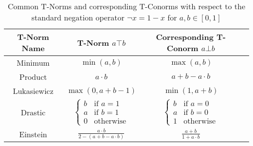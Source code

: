\begin{table}[H]
      \centering
      {\renewcommand{\arraystretch}{1.2}
            \begin{tabular}{|c|c|c|c|}
                  \hline
                  T-Norm Name & T-Norm   $a \top b$                                                                              & Corresponding T-Conorm      $a \bot b$                                                           \\
                  \hline
                  Minimum     & $\min(a, b)$                                                                                     & $\max(a, b)$                                                                                     \\
                  Product     & $a \cdot b$                                                                                      & $a + b - a \cdot b$                                                                              \\
                  Lukasiewicz & $\max(0, a + b - 1)$                                                                             & $\min(1, a + b)$                                                                                 \\
                  Drastic     & $\begin{cases} b & \text{if } a = 1 \\ a & \text{if } b = 1 \\ 0 & \text{otherwise} \end{cases}$ & $\begin{cases} b & \text{if } a = 0 \\ a & \text{if } b = 0 \\ 1 & \text{otherwise} \end{cases}$ \\
                  Einstein    & $\frac{a \cdot b}{2 - (a + b - a \cdot b)}$                                                      & $\frac{a + b}{1 + a \cdot b}$                                                                    \\

                  \hline
            \end{tabular}
      }
      \caption{Common T-Norms and corresponding T-Conorms with respect to the standard negation operator $\neg x = 1 - x$
            for $a, b \in [0, 1]$}
      \label{tab:tnorms}
\end{table}

